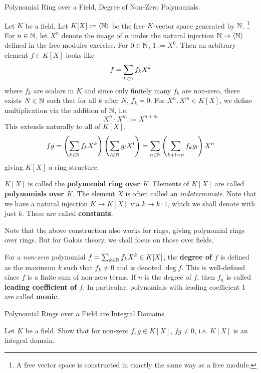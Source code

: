 \documentclass[../../book.tex]{subfiles}
\begin{document}
\begin{dfn} Polynomial Ring over a Field, Degree of Non-Zero Polynomials. 

    Let $K$ be a field. 
    Let $K[X] := \langle\mathbb{N}\rangle$ be the free $K$-vector space generated by $\mathbb{N}$.
    \footnote{
    A free vector space is constructed in exactly the same way as a free module.
    } 
    For $n \in \mathbb{N}$, let $X^n$ denote the image of $n$ 
    under the natural injection $\mathbb{N} \to \langle\mathbb{N}\rangle$ 
    defined in the free modules exercise. 
    For $0 \in \mathbb{N}$, $1 := X^0$. 
    Then an arbitrary element $f \in K[X]$ looks like \[
        f = \sum_{k \in \mathbb{N}} f_k X^k
    \]
    where $f_k$ are scalars in $K$ and
    since only finitely many $f_k$ are non-zero,
    there exists $N \in \mathbb{N}$ such that for all $k$ after $N$, $f_k = 0$. 
    For $X^n, X^m \in K[X]$, we define multiplication via the addition of $\mathbb{N}$,
    i.e. \[X^n \cdot X^m := X^{n + m}\]
    This extends naturally to all of $K[X]$, \[
    fg = \left(\sum_{k \in \mathbb{N}} f_k X^k\right)\left(\sum_{l \in \mathbb{N}} g_l X^l\right) 
    = \sum_{n \in \mathbb{N}} \left(\sum_{k + l = n} f_k g_l\right) X^n
    \]
    giving $K[X]$ a ring structure.
    
    $K[X]$ is called the \textbf{polynomial ring over $K$}.
    Elements of $K[X]$ are called \textbf{polynomials over $K$}. 
    The element $X$ is often called an \emph{indeterminate}. 
    Note that we have a natural injection $K \to K[X]$ via $k \mapsto k\cdot 1$,
    which we shall denote with just $k$. 
    These are called \textbf{constants}. 
    
    Note that the above construction also works for rings, 
    giving polynomial rings over rings.
    But for Galois theory, we shall focus on those over fields. 
    
    For a \emph{non-zero} polynomial $f = \sum_{k \in \mathbb{N}} f_k X^k\in K[X]$, 
    the \textbf{degree of $f$} is defined as 
    the maximum $k$ such that $f_k \neq 0$ and is denoted $\deg f$. 
    This is well-defined since $f$ is a finite sum of non-zero terms. 
    If $n$ is the degree of $f$, then $f_n$ is called 
    \textbf{leading coefficient of $f$}. 
    In particular, polynomials with leading coefficient 1 are called \textbf{monic}.
\end{dfn}

\begin{ex} [Important] Polynomial Rings over a Field are Integral Domains. 
    
    Let $K$ be a field. 
    Show that for non-zero $f, g \in K[X]$, $fg \neq 0$,
    i.e. $K[X]$ is an integral domain. 
\end{ex}
\end{document}
